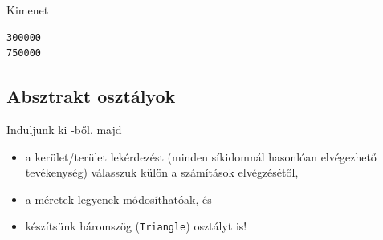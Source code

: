 \begin{frame}
    \begin{columns}[T]
            \begin{exampleblock}{}
                \vspace{-.2cm}
                \fontsize{7}{8} \selectfont
                
                \vspace{-.2cm}
            \end{exampleblock}
            \begin{exampleblock}{}
                \vspace{-.2cm}
                \fontsize{7}{8} \selectfont
                
                \vspace{-.2cm}
            \end{exampleblock}
    \end{columns}
\end{frame}

\begin{frame}[fragile]
    \begin{exampleblock}{}
        \footnotesize
        
        
    \end{exampleblock}
    \begin{block}{Kimenet}
        \footnotesize
        \vspace{-.3cm}
        \begin{verbatim}
300000
750000
        \end{verbatim}
        \vspace{-.6cm}
    \end{block}
\end{frame}

\subsection{Absztrakt osztályok}

\begin{frame}
    Induljunk ki -ből, majd 
    \begin{itemize}
        \item a kerület/terület lekérdezést (minden síkidomnál hasonlóan elvégezhető tevékenység) válasszuk külön a számítások elvégzésétől,
        \item a méretek legyenek módosíthatóak, és
        \item készítsünk háromszög (\texttt{Triangle}) osztályt is!
    \end{itemize}
\end{frame}    
     
